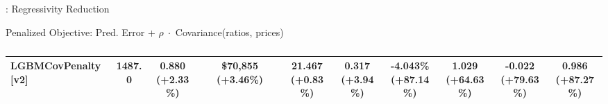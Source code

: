 \documentclass[aspectratio=169,10pt]{beamer}
\begin{document}
\begin{frame}{\sectionY: Regressivity Reduction}
\begin{block}{{\color{blue}Penalized Objective:} Pred. Error + $\rho\; \cdot$  Covariance(ratios, prices)}
\begin{table}[]
{\begin{tabular}{lc|cc|cc|cccc}
LGBMCovPenalty [v2] & 1487.0 &
\makecell{\textbf{0.880}\\{\scriptsize(\textcolor{green!60!black}{+2.33\%})}} &
\makecell{\textbf{\$70,855}\\{\scriptsize(\textcolor{green!60!black}{+3.46\%})}} &
\makecell{\textbf{21.467}\\{\scriptsize(\textcolor{green!60!black}{+0.83\%})}} &
\makecell{\textbf{0.317}\\{\scriptsize(\textcolor{green!60!black}{+3.94\%})}} &
\makecell{\textbf{-4.043\%}\\{\scriptsize(\textcolor{green!60!black}{+87.14\%})}} &
\makecell{\textbf{1.029}\\{\scriptsize(\textcolor{green!60!black}{+64.63\%})}} &
\makecell{\textbf{-0.022}\\{\scriptsize(\textcolor{green!60!black}{+79.63\%})}} &
\makecell{\textbf{0.986}\\{\scriptsize(\textcolor{green!60!black}{+87.27\%})}} \\
\bottomrule
\end{tabular}
}
\vspace{-1mm}
\caption{\captionF}
\vspace{-5mm}
\end{table}
\end{block}


\end{frame}
\end{document}
